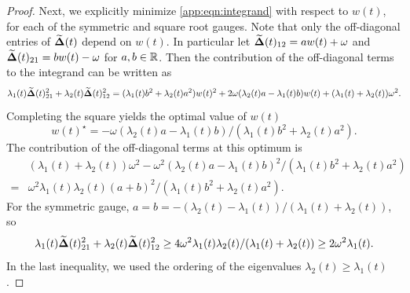 \begin{proof}
Next, we explicitly minimize  \cref{app:eqn:integrand} with respect to $w(t)$, for each of the symmetric and square root gauges. 
Note that only the off-diagonal entries of $\widetilde{\boldsymbol{\Delta}}(t)$ depend on $w(t)$. 
In particular let $\widetilde{\boldsymbol{\Delta}}(t)_{12} = a w(t) + \omega$ and $\widetilde{\boldsymbol{\Delta}}(t)_{21} = b w(t) - \omega$ for $a, b \in \mathbb{R}$. Then the contribution of the off-diagonal terms to the integrand can be written as 
\begin{equation*}
    \lambda_1(t)\widetilde{\boldsymbol{\Delta}}(t)_{21}^2 + \lambda_2(t)\widetilde{\boldsymbol{\Delta}}(t)_{12}^2  = (\lambda_1(t)b^2 + \lambda_2(t)a^2) w(t)^2 + 2 \omega (\lambda_2(t) a - \lambda_1(t) b) w(t) + (\lambda_1(t) + \lambda_2(t))\omega^2.
\end{equation*}
Completing the square yields the optimal value of $w(t)$
\begin{equation*}
    w(t)^\star = - \omega (\lambda_2(t) a - \lambda_1(t) b) / (\lambda_1(t) b^2 + \lambda_2(t) a^2).
\end{equation*}
The contribution of the off-diagonal terms at this optimum is
\begin{equation}\label{app:eqn:optimal-angle}
\begin{aligned}
    &(\lambda_1(t) + \lambda_2(t))\omega^2 - \omega^2 (\lambda_2(t) a - \lambda_1(t) b)^2 / (\lambda_1(t) b^2 + \lambda_2(t) a^2)\\
    = &\omega^2 \lambda_1(t) \lambda_2(t) (a+b)^2 / (\lambda_1(t) b^2 + \lambda_2(t) a^2).
\end{aligned}
\end{equation}
For the symmetric gauge, $a = b = - (\lambda_2(t) - \lambda_1(t)) / (\lambda_1(t) + \lambda_2(t))$, so 
\begin{equation*}
    \lambda_1(t)\widetilde{\boldsymbol{\Delta}}(t)_{21}^2 + \lambda_2(t)\widetilde{\boldsymbol{\Delta}}(t)_{12}^2 \geq 4 \omega^2 \lambda_1(t) \lambda_2(t) / (\lambda_1(t) +  \lambda_2(t)) \geq 2 \omega^2 \lambda_1(t). 
\end{equation*}
In the last inequality, we used the ordering of the eigenvalues $\lambda_2(t) \geq \lambda_1(t)$.


\end{proof}
